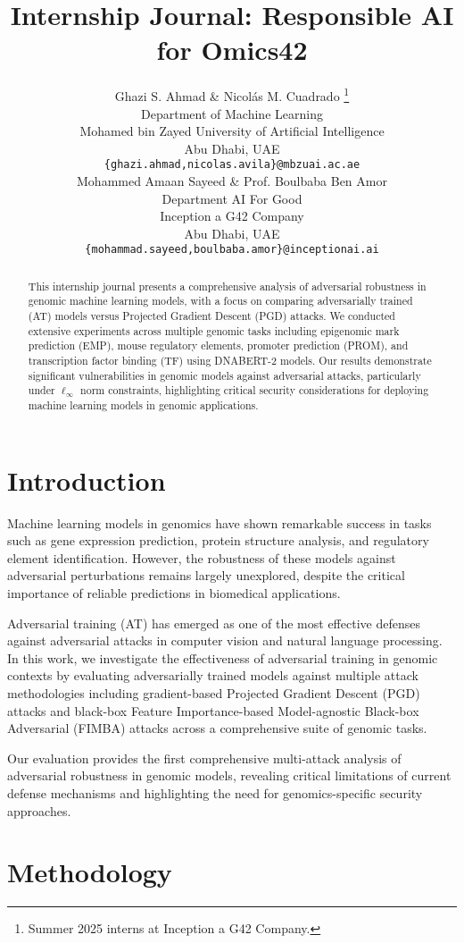 \documentclass{article} %
\title{Internship Journal: Responsible AI for Omics42}
\author{Ghazi S. Ahmad \& Nicolás M. Cuadrado \thanks{Summer 2025 interns at Inception a G42 Company.} \\
    Department of Machine Learning\\
    Mohamed bin Zayed University of Artificial Intelligence\\
    Abu Dhabi, UAE \\
    \texttt{\{ghazi.ahmad,nicolas.avila\}@mbzuai.ac.ae} \\
    \AND
    Mohammed Amaan Sayeed \& Prof. Boulbaba Ben Amor \\
    Department AI For Good \\
    Inception a G42 Company \\
    Abu Dhabi, UAE \\
    \texttt{\{mohammad.sayeed,boulbaba.amor\}@inceptionai.ai} \\
    }
\begin{document}
\maketitle

\begin{abstract}
This internship journal presents a comprehensive analysis of adversarial robustness in genomic machine learning models, with a focus on comparing adversarially trained (AT) models versus Projected Gradient Descent (PGD) attacks. We conducted extensive experiments across multiple genomic tasks including epigenomic mark prediction (EMP), mouse regulatory elements, promoter prediction (PROM), and transcription factor binding (TF) using DNABERT-2 models. Our results demonstrate significant vulnerabilities in genomic models against adversarial attacks, particularly under $\ell_\infty$ norm constraints, highlighting critical security considerations for deploying machine learning models in genomic applications.
\end{abstract}

\section{Introduction}

Machine learning models in genomics have shown remarkable success in tasks such as gene expression prediction, protein structure analysis, and regulatory element identification. However, the robustness of these models against adversarial perturbations remains largely unexplored, despite the critical importance of reliable predictions in biomedical applications.

Adversarial training (AT) has emerged as one of the most effective defenses against adversarial attacks in computer vision and natural language processing. In this work, we investigate the effectiveness of adversarial training in genomic contexts by evaluating adversarially trained models against multiple attack methodologies including gradient-based Projected Gradient Descent (PGD) attacks and black-box Feature Importance-based Model-agnostic Black-box Adversarial (FIMBA) attacks across a comprehensive suite of genomic tasks.

Our evaluation provides the first comprehensive multi-attack analysis of adversarial robustness in genomic models, revealing critical limitations of current defense mechanisms and highlighting the need for genomics-specific security approaches.

\section{Methodology}
\end{document}
